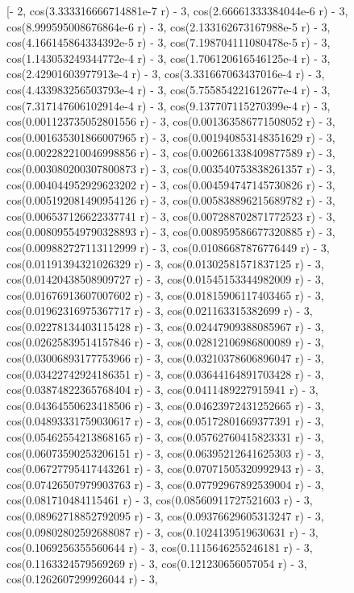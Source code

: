 \documentclass[12pt,arial,letterpaper]{book}
\begin{document}
\begin{eulercomment}
\begin{eulercomment}
\begin{eulercomment}
\begin{eulercomment}
\begin{eulercomment}
\begin{eulercomment}
\begin{eulercomment}
\begin{eulercomment}
\begin{eulercomment}
\begin{eulercomment}
\begin{eulercomment}
\begin{eulercomment}
\begin{eulercomment}
\begin{eulercomment}
\begin{eulercomment}
\begin{eulercomment}
\begin{eulercomment}
\begin{eulercomment}
\begin{eulercomment}
\begin{eulercomment}
\begin{eulercomment}
\begin{eulercomment}
\begin{euleroutput}
          [- 2, cos(3.333316666714881e-7 r) - 3, 
  cos(2.66661333384044e-6 r) - 3, cos(8.999595008676864e-6 r) - 3, 
  cos(2.133162673167988e-5 r) - 3, cos(4.166145864334392e-5 r) - 3, 
  cos(7.198704111080478e-5 r) - 3, cos(1.143053249344772e-4 r) - 3, 
  cos(1.706120616546125e-4 r) - 3, cos(2.42901603977913e-4 r) - 3, 
  cos(3.331667063437016e-4 r) - 3, cos(4.433983256503793e-4 r) - 3, 
  cos(5.755854221612677e-4 r) - 3, cos(7.317147606102914e-4 r) - 3, 
  cos(9.137707115270399e-4 r) - 3, cos(0.001123735052801556 r) - 3, 
  cos(0.001363586771508052 r) - 3, cos(0.001635301866007965 r) - 3, 
  cos(0.001940853148351629 r) - 3, cos(0.002282210046998856 r) - 3, 
  cos(0.002661338409877589 r) - 3, cos(0.003080200307800873 r) - 3, 
  cos(0.003540753838261357 r) - 3, cos(0.004044952929623202 r) - 3, 
  cos(0.004594747145730826 r) - 3, cos(0.005192081490954126 r) - 3, 
  cos(0.005838896215689782 r) - 3, cos(0.006537126622337741 r) - 3, 
  cos(0.007288702871772523 r) - 3, cos(0.008095549790328893 r) - 3, 
  cos(0.008959586677320885 r) - 3, cos(0.009882727113112999 r) - 3, 
  cos(0.01086687876776449 r) - 3, cos(0.01191394321026329 r) - 3, 
  cos(0.01302581571837125 r) - 3, cos(0.01420438508909727 r) - 3, 
  cos(0.01545153344982009 r) - 3, cos(0.01676913607007602 r) - 3, 
  cos(0.01815906117403465 r) - 3, cos(0.01962316975367717 r) - 3, 
  cos(0.021163315382699 r) - 3, cos(0.02278134403115428 r) - 3, 
  cos(0.02447909388085967 r) - 3, cos(0.02625839514157846 r) - 3, 
  cos(0.02812106986800089 r) - 3, cos(0.03006893177753966 r) - 3, 
  cos(0.03210378606896047 r) - 3, cos(0.03422742924186351 r) - 3, 
  cos(0.03644164891703428 r) - 3, cos(0.03874822365768404 r) - 3, 
  cos(0.0411489227915941 r) - 3, cos(0.04364550623418506 r) - 3, 
  cos(0.04623972431252665 r) - 3, cos(0.04893331759030617 r) - 3, 
  cos(0.05172801669377391 r) - 3, cos(0.05462554213868165 r) - 3, 
  cos(0.05762760415823331 r) - 3, cos(0.06073590253206151 r) - 3, 
  cos(0.06395212641625303 r) - 3, cos(0.06727795417443261 r) - 3, 
  cos(0.07071505320992943 r) - 3, cos(0.07426507979903763 r) - 3, 
  cos(0.07792967892539004 r) - 3, cos(0.081710484115461 r) - 3, 
  cos(0.08560911727521603 r) - 3, cos(0.08962718852792095 r) - 3, 
  cos(0.09376629605313247 r) - 3, cos(0.09802802592688087 r) - 3, 
  cos(0.1024139519630631 r) - 3, cos(0.1069256355560644 r) - 3, 
  cos(0.1115646255246181 r) - 3, cos(0.1163324579569269 r) - 3, 
  cos(0.121230656057054 r) - 3, cos(0.1262607299926044 r) - 3, 

\end{euleroutput}
\end{eulercomment}
\end{eulercomment}
\end{eulercomment}
\end{eulercomment}
\end{eulercomment}
\end{eulercomment}
\end{eulercomment}
\end{eulercomment}
\end{eulercomment}
\end{eulercomment}
\end{eulercomment}
\end{eulercomment}
\end{eulercomment}
\end{eulercomment}
\end{eulercomment}
\end{eulercomment}
\end{eulercomment}
\end{eulercomment}
\end{eulercomment}
\end{eulercomment}
\end{eulercomment}
\end{eulercomment}
\end{document}

